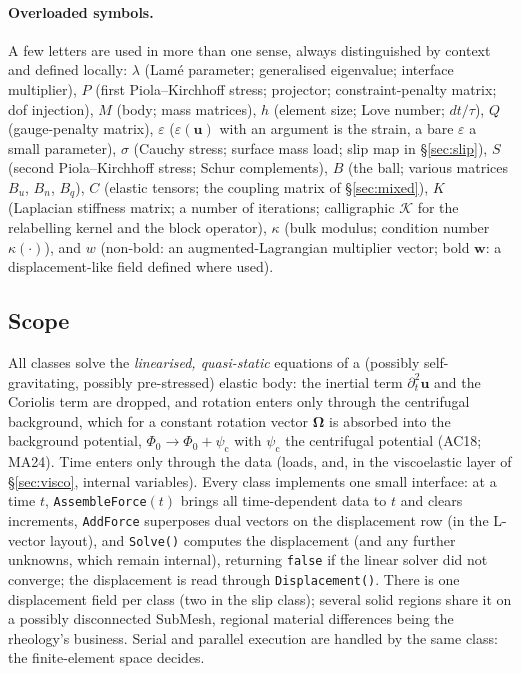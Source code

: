 \documentclass[11pt]{article}
\numberwithin{equation}{section}
\theoremstyle{remark}
\newcommand{\eps}{\varepsilon}
\newcommand{\vu}{\mathbf{u}}
\newcommand{\vw}{\mathbf{w}}
\newcommand{\code}[1]{\texttt{#1}}
\begin{document}
\paragraph{Overloaded symbols.} A few letters are used in more than one
sense, always distinguished by context and defined locally: $\lambda$
(Lam\'e parameter; generalised eigenvalue; interface multiplier), $P$
(first Piola--Kirchhoff stress; projector; constraint-penalty matrix;
dof injection), $M$ (body; mass matrices), $h$ (element size; Love number;
$dt/\tau$), $Q$ (gauge-penalty matrix), $\eps$ ($\eps(\vu)$ with an
argument is the strain, a bare $\eps$ a small parameter), $\sigma$ (Cauchy
stress; surface mass load; slip map in \S\ref{sec:slip}), $S$ (second
Piola--Kirchhoff stress; Schur complements), $B$ (the ball; various
matrices $B_u$, $B_n$, $B_q$), $C$ (elastic tensors; the coupling matrix of
\S\ref{sec:mixed}), $K$ (Laplacian stiffness matrix; a number of
iterations; calligraphic $\mathcal{K}$ for the relabelling kernel and the
block operator), $\kappa$ (bulk modulus; condition number $\kappa(\cdot)$),
and $w$
(non-bold: an augmented-Lagrangian multiplier vector; bold $\vw$: a
displacement-like field defined where used).

\subsection{Scope}

All classes solve the \emph{linearised, quasi-static} equations of a
(possibly self-gravitating, possibly pre-stressed) elastic body: the
inertial term $\partial_t^2\vu$ and the Coriolis term are dropped, and
rotation enters only through the centrifugal background, which for a
constant rotation vector $\bm{\Omega}$ is absorbed into the background
potential, $\Phi_0 \to \Phi_0 + \psi_{\mathrm{c}}$ with
$\psi_{\mathrm{c}}$ the centrifugal potential (AC18; MA24). Time enters only through the data (loads,
and, in the viscoelastic layer of \S\ref{sec:visco}, internal variables).
Every class implements one small interface: at a time $t$,
\code{AssembleForce}$(t)$ brings all time-dependent data to $t$ and
clears increments, \code{AddForce} superposes dual vectors on the
displacement row (in the L-vector layout), and \code{Solve()} computes the
displacement (and any further unknowns, which remain internal), returning
\code{false} if the linear solver did not converge; the displacement is
read through \code{Displacement()}. There is one displacement field
per class (two in the slip class); several solid regions share it on a
possibly disconnected SubMesh, regional material differences being the
rheology's business. Serial and parallel execution are handled by the same
class: the finite-element space decides.
\end{document}

